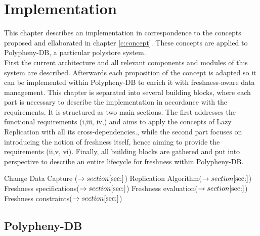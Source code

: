 \chapter{Implementation}
\label{c:implementation}

This chapter describes an implementation in correspondence to the concepts proposed and ellaborated in chapter \ref{c:concept}. 
These concepts are applied to Polypheny-DB, a particular polystore system.\\
First the current architecture and all relevant components and modules of this system are described. Afterwards each proposition of the concept is adapted
so it can be implemented within Polypheny-DB to enrich it with freshness-aware data management.
This chapter is separated into several building blocks, where each part is necessary to describe the implementation in accordance with the requirements.
It is structured as two main sections. The first addresses the functional requirements (i,iii, iv,) and aims to apply the concepts of Lazy Replication with all its
cross-dependencies., while the second part focuses on introducing the notion of freshness itself, hence aiming to provide the requirements (ii,v, vi).
Finally, all building blocks are gathered and put into perspective to describe an entire lifecycle for freshness within Polypheny-DB. 



Change Data Capture ($\rightarrow section \ref{sec:}$)
Replication Algorithm($\rightarrow section \ref{sec:}$)
Freshness specifications($\rightarrow section \ref{sec:}$)
Freshness evaluation($\rightarrow section \ref{sec:}$)
Freshness constraints($\rightarrow section \ref{sec:}$)









\section{Polypheny-DB}
\label{sec:architecture}



